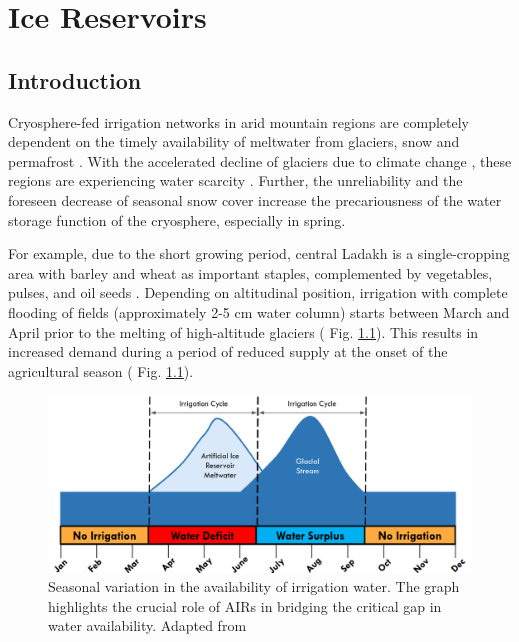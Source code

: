 \chapter{Ice Reservoirs}


\section{Introduction}

Cryosphere-fed irrigation networks in arid mountain regions are completely dependent on the timely availability
of meltwater from glaciers, snow and permafrost \citep{immerzeelImportanceVulnerabilityWorld2020,
farhanHydrologicalRegimesConjunction2015, tveitenGlacierGrowingLocal2007}. With the accelerated decline of
glaciers due to climate change \citep{nusserLocalKnowledgeGlobal2016}, these regions are experiencing water
scarcity \citep{norphelSnowWaterHarvesting2015, mukhopadhyayReevaluationSnowmeltGlacial2015}. Further, the
unreliability and the foreseen decrease of seasonal snow cover \citep{chevuturiClimateChangeLeh2018} increase
the precariousness of the water storage function of the cryosphere, especially in spring.

For example, due to the short growing period, central Ladakh is a single-cropping area with barley and wheat as
important staples, complemented by vegetables, pulses, and oil seeds
\citep{nusserSociohydrologyArtificialGlaciers2019}. Depending on altitudinal position, irrigation with complete
flooding of fields (approximately 2-5 cm water column) starts between March and April prior to the melting of
high-altitude glaciers ( Fig. \ref{fig:irrigation_cycles}). This results in increased demand during a period of
reduced supply at the onset of the agricultural season ( Fig. \ref{fig:irrigation_cycles}).

\begin{figure}[htb]
\centering
\includegraphics[width=12cm]{figs/irrigation_cycles.png}
\caption{Seasonal variation in the availability of irrigation water. The graph highlights the crucial role of
AIRs in bridging the critical gap in water availability. Adapted from \cite{nusserLocalKnowledgeGlobal2016}}
\label{fig:irrigation_cycles}
\end{figure}


